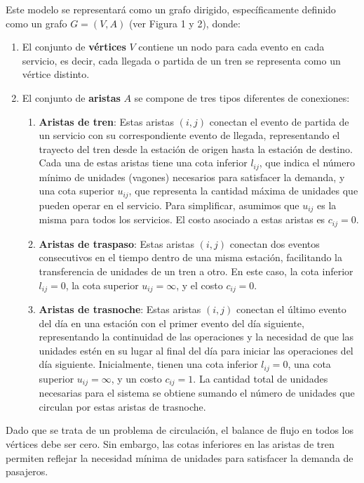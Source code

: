 \documentclass{article}
\begin{document}
     

    
    Este modelo se representará como un grafo dirigido, específicamente definido como un grafo $G = (V, A)$ (ver Figura 1 y 2), donde:

    \begin{enumerate}
    \item El conjunto de \textbf{vértices} $V$ contiene un nodo para cada evento en cada servicio, es decir, cada llegada o partida de un tren se representa como un vértice distinto.
    \item El conjunto de \textbf{aristas} $A$ se compone de tres tipos diferentes de conexiones:
    \begin{enumerate}
        \item \textbf{Aristas de tren}: Estas aristas $(i, j)$ conectan el evento de partida de un servicio con su correspondiente evento de llegada, representando el trayecto del tren desde la estación de origen hasta la estación de destino. Cada una de estas aristas tiene una cota inferior $l_{ij}$, que indica el número mínimo de unidades (vagones) necesarios para satisfacer la demanda, y una cota superior $u_{ij}$, que representa la cantidad máxima de unidades que pueden operar en el servicio. Para simplificar, asumimos que $u_{ij}$ es la misma para todos los servicios. El costo asociado a estas aristas es $c_{ij} = 0$.
        \item \textbf{Aristas de traspaso}: Estas aristas $(i, j)$ conectan dos eventos consecutivos en el tiempo dentro de una misma estación, facilitando la transferencia de unidades de un tren a otro. En este caso, la cota inferior $l_{ij} = 0$, la cota superior $u_{ij} = \infty$, y el costo $c_{ij} = 0$.
        \item \textbf{Aristas de trasnoche}: Estas aristas $(i, j)$ conectan el último evento del día en una estación con el primer evento del día siguiente, representando la continuidad de las operaciones y la necesidad de que las unidades estén en su lugar al final del día para iniciar las operaciones del día siguiente. Inicialmente, tienen una cota inferior $l_{ij} = 0$, una cota superior $u_{ij} = \infty$, y un costo $c_{ij} = 1$. La cantidad total de unidades necesarias para el sistema se obtiene sumando el número de unidades que circulan por estas aristas de trasnoche.
    \end{enumerate}
    \end{enumerate}

    Dado que se trata de un problema de circulación, el balance de flujo en todos los vértices debe ser cero. Sin embargo, las cotas inferiores en las aristas de tren permiten reflejar la necesidad mínima de unidades para satisfacer la demanda de pasajeros.
\end{document}
